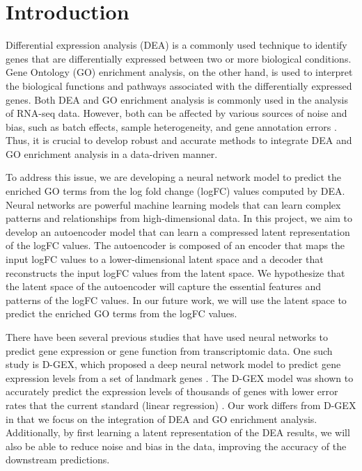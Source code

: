 
\section{Introduction}

Differential expression analysis (DEA) is a commonly used technique to identify genes that
are differentially expressed between two or more biological conditions. Gene Ontology
(GO) enrichment analysis, on the other hand, is used to interpret the biological
functions and pathways associated with the differentially expressed genes. Both DEA and
GO enrichment analysis is commonly used in the analysis of RNA-seq data. However, both
can be affected by various sources of noise and bias, such as batch effects, sample
heterogeneity, and gene annotation errors \cite{koch2018beginner}. Thus, it is crucial to
develop robust and accurate methods to integrate DEA and GO enrichment analysis in a
data-driven manner.

To address this issue, we are developing a neural network model to predict the enriched
GO terms from the log fold change (logFC) values computed by DEA. Neural networks are
powerful machine learning models that can learn complex patterns and relationships from
high-dimensional data. In this project, we aim to develop an autoencoder model that can
learn a compressed latent representation of the logFC values. The autoencoder is composed
of an encoder that maps the input logFC values to a lower-dimensional latent space and a
decoder that reconstructs the input logFC values from the latent space. We hypothesize
that the latent space of the autoencoder will capture the essential features and patterns
of the logFC values. In our future work, we will use the latent space to predict the
enriched GO terms from the logFC values.

There have been several previous studies that have used neural networks to predict
gene expression or gene function from transcriptomic data. One such study is D-GEX,
which proposed a deep neural network model to predict gene expression levels from a set
of landmark genes \cite{D-GEX}. The D-GEX model was shown to accurately predict the
expression levels of thousands of genes with lower error rates that the current standard
(linear regression) \cite{D-GEX}. Our work differs from D-GEX in that we
focus on the integration of DEA and GO enrichment analysis. Additionally, by first
learning a latent representation of the DEA results, we will also be able to reduce
noise and bias in the data, improving the accuracy of the downstream predictions.
